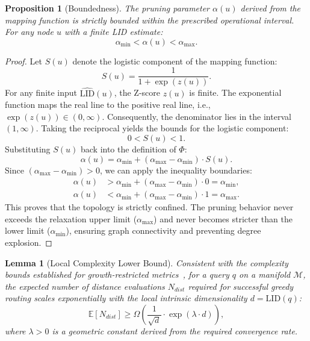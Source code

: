 \documentclass{article}
\theoremstyle{plain}
\newtheorem{proposition}[theorem]{Proposition}
\newtheorem{lemma}[theorem]{Lemma}
\theoremstyle{definition}
\theoremstyle{remark}
\begin{document}
\begin{proposition}[Boundedness]\label{proof:bound}
The pruning parameter $\alpha(u)$ derived from the mapping function is strictly bounded within the prescribed operational interval. For any node $u$ with a finite LID estimate:
\begin{equation}
    \alpha_{\min} < \alpha(u) < \alpha_{\max}.
\end{equation}
\end{proposition}

\begin{proof}
Let $S(u)$ denote the logistic component of the mapping function:
\begin{equation}
    S(u) = \frac{1}{1 + \exp(z(u))}.
\end{equation}
For any finite input $\widehat{\text{LID}}(u)$, the Z-score $z(u)$ is finite. The exponential function maps the real line to the positive real line, i.e., $\exp(z(u)) \in (0, \infty)$.
Consequently, the denominator lies in the interval $(1, \infty)$. Taking the reciprocal yields the bounds for the logistic component:
\begin{equation}
    0 < S(u) < 1.
\end{equation}
Substituting $S(u)$ back into the definition of $\Phi$:
\begin{equation}
    \alpha(u) = \alpha_{\min} + (\alpha_{\max} - \alpha_{\min}) \cdot S(u).
\end{equation}
Since $(\alpha_{\max} - \alpha_{\min}) > 0$, we can apply the inequality boundaries:
\begin{align}
    \alpha(u) &> \alpha_{\min} + (\alpha_{\max} - \alpha_{\min}) \cdot 0 = \alpha_{\min}, \\
    \alpha(u) &< \alpha_{\min} + (\alpha_{\max} - \alpha_{\min}) \cdot 1 = \alpha_{\max}.
\end{align}
This proves that the topology is strictly confined. 
The pruning behavior never exceeds the relaxation upper limit ($\alpha_{\max}$) and never becomes stricter than the lower limit ($\alpha_{\min}$), ensuring graph connectivity and preventing degree explosion.
\end{proof}

\begin{lemma}[Local Complexity Lower Bound]
\label{proof:complexity}
Consistent with the complexity bounds established for growth-restricted metrics~\cite{karger2002finding}, for a query $q$ on a manifold $\mathcal{M}$, the expected number of distance evaluations $N_{dist}$ required for successful greedy routing scales exponentially with the local intrinsic dimensionality $d = \text{LID}(q)$:
\begin{equation}
    \mathbb{E}[N_{dist}] \ge \Omega\left( \frac{1}{\sqrt{d}} \cdot \exp(\lambda \cdot d) \right),
\end{equation}
where $\lambda > 0$ is a geometric constant derived from the required convergence rate.
\end{lemma}
\end{document}
